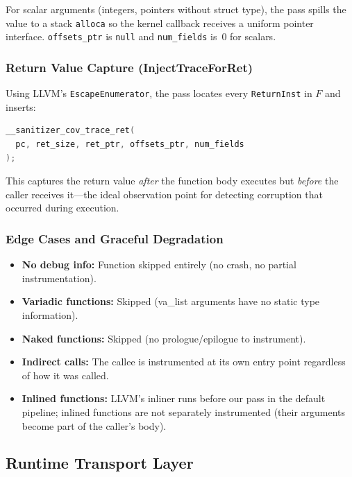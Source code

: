 \documentclass{ndss}
\begin{document}
For scalar arguments (integers, pointers without struct type), the pass spills
the value to a stack \texttt{alloca} so the kernel callback receives a uniform
pointer interface. \texttt{offsets\_ptr} is \texttt{null} and
\texttt{num\_fields} is~0 for scalars.

\subsubsection{Return Value Capture (InjectTraceForRet)}

Using LLVM's \texttt{EscapeEnumerator}, the pass locates every
\texttt{ReturnInst} in $F$ and inserts:
\begin{lstlisting}[language=C,numbers=none]
__sanitizer_cov_trace_ret(
  pc, ret_size, ret_ptr, offsets_ptr, num_fields
);
\end{lstlisting}

This captures the return value \emph{after} the function body executes but
\emph{before} the caller receives it---the ideal observation point for
detecting corruption that occurred during execution.

\subsubsection{Edge Cases and Graceful Degradation}

\begin{itemize}[nosep]
  \item \textbf{No debug info:} Function skipped entirely (no crash, no
        partial instrumentation).
  \item \textbf{Variadic functions:} Skipped (va\_list arguments have no
        static type information).
  \item \textbf{Naked functions:} Skipped (no prologue/epilogue to instrument).
  \item \textbf{Indirect calls:} The callee is instrumented at its own entry
        point regardless of how it was called.
  \item \textbf{Inlined functions:} LLVM's inliner runs before our pass in the
        default pipeline; inlined functions are not separately instrumented
        (their arguments become part of the caller's body).
\end{itemize}

\subsection{Runtime Transport Layer}\label{sec:transport}
\end{document}
